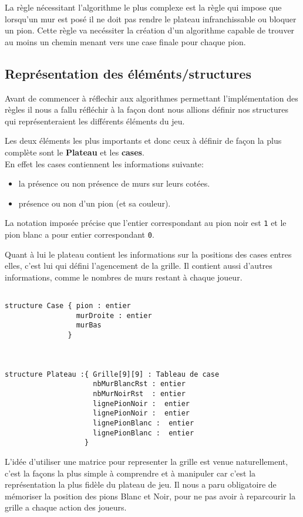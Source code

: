 \documentclass[a4paper, draft]{article}
\begin{document}
La règle nécessitant l'algorithme le plus complexe est la règle qui impose que lorsqu'un mur est posé il ne doit pas rendre le plateau infranchissable ou bloquer un pion.
Cette règle va necéssiter la création d'un algorithme capable de trouver au moins un chemin menant vers une case finale pour chaque pion.


\subsection{Représentation des éléménts/structures}

Avant de commencer à réflechir aux algorithmes permettant l'implémentation des règles il nous a fallu réfléchir à la façon dont nous allions définir nos structures
qui représenteraient les différents éléments du jeu. 

Les deux éléments les plus importants et donc ceux à définir de façon la plus complète sont le \textbf{Plateau} et les \textbf{cases}.\\
En effet les cases contiennent les informations suivante:
\begin{itemize}
 \item la présence ou non présence de murs sur leurs cotées.
 \item présence ou non d'un pion (et sa couleur).
\end{itemize}
La notation imposée précise que l'entier correspondant au pion noir est \verb?1? et le pion blanc a pour entier correspondant \verb?0?.


Quant à lui le plateau contient les informations sur la positions des cases entres elles, c'est lui qui défini l'agencement de la grille.
Il contient aussi d'autres informations, comme le nombres de murs restant à chaque joueur.


\begin{verbatim}
            
structure Case { pion : entier
                 murDroite : entier
                 murBas                             
               }                   
                                                                
                                                  
                     
structure Plateau :{ Grille[9][9] : Tableau de case
                     nbMurBlancRst : entier
                     nbMurNoirRst  : entier
                     lignePionNoir :  entier
                     lignePionNoir :  entier         
                     lignePionBlanc :  entier         
                     lignePionBlanc :  entier         
                   }

\end{verbatim}        
L'idée d'utiliser une matrice pour representer la grille est venue naturellement, c'est la façons la plus simple à comprendre et à manipuler  car c'est la représentation la plus fidèle
du plateau de jeu.
Il nous a paru obligatoire de mémoriser la position des pions Blanc et Noir, pour ne pas avoir à reparcourir la grille
a chaque action des joueurs.
\end{document}
